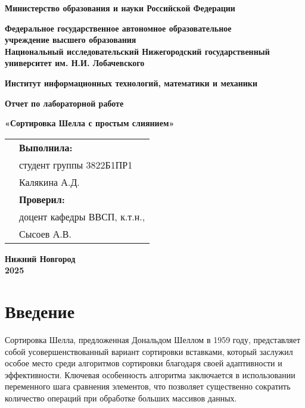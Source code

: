 \documentclass[a4paper,14pt]{extarticle}
\begin{document}
\begin{center}
    \textbf{Министерство образования и науки Российской Федерации}
    
    \textbf{Федеральное государственное автономное образовательное}\\
    \textbf{учреждение высшего образования}\\
    \textbf{Национальный исследовательский Нижегородский государственный}\\
    \textbf{университет им. Н.И. Лобачевского}
    
    \vspace{0.5cm}
    
    \textbf{Институт информационных технологий, математики и механики}
    
    \vspace{3cm}
    
    \textbf{Отчет по лабораторной работе}
    
    \vspace{1cm}
    
    {\LARGE \textbf{«Сортировка Шелла с простым слиянием»}}
    
    \vspace{3cm}
    
    \begin{tabular}{m{8cm} m{8cm}}
        & \textbf{Выполнила:} \\
        & студент группы 3822Б1ПР1 \\
        & Калякина А.Д. \\
        & \textbf{Проверил:} \\
        & доцент кафедры ВВСП, к.т.н., \\
        & Сысоев А.В. \\
    \end{tabular}
    
    \vfill
    
    \textbf{Нижний Новгород}\\
    \textbf{2025}
\end{center}

\newpage

\section*{Введение}
Сортировка Шелла, предложенная Дональдом Шеллом в 1959 году, представляет собой усовершенствованный вариант сортировки вставками, который заслужил особое место среди алгоритмов сортировки благодаря своей адаптивности и эффективности. Ключевая особенность алгоритма заключается в использовании переменного шага сравнения элементов, что позволяет существенно сократить количество операций при обработке больших массивов данных.
\end{document}
